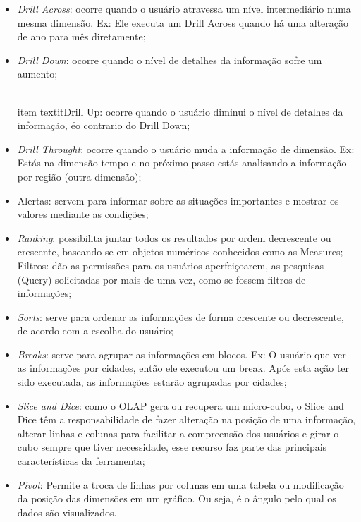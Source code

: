 \begin{itemize}

    \item \textit{Drill Across}: ocorre quando o usuário atravessa um nível intermediário numa mesma dimensão. Ex: Ele executa um Drill Across quando há uma alteração de ano para mês diretamente;

    \item \textit{Drill Down}: ocorre quando o nível de detalhes da informação sofre um aumento;
    
    \\item textit{Drill Up}: ocorre quando o usuário diminui o nível de detalhes da informação, \'{e}o contrario do Drill Down;
    
    \item \textit{Drill Throught}: ocorre quando o usuário muda a informação de dimensão. Ex: Estás na dimensão tempo e no próximo passo estás analisando a informação por região (outra dimensão);
    
    \item Alertas: servem para informar sobre as situações importantes e mostrar os valores mediante as condições;
    
    \item \textit{Ranking}: possibilita juntar todos os resultados por ordem decrescente ou crescente, baseando-se em objetos numéricos conhecidos como as Measures;
    Filtros: d\~{a}o as permissões para os usuários aperfeiçoarem, as pesquisas (Query) solicitadas por mais de uma vez, como se fossem filtros de informações;
    
    \item \textit{Sorts}: serve para ordenar as informações de forma crescente ou decrescente, de acordo com a escolha do usuário;
    
    \item \textit{Breaks}: serve para agrupar as informações em blocos. Ex: O usuário que ver as informações por cidades, então ele executou um break. Após esta ação ter sido executada, as informações estarão agrupadas por cidades;
    
    \item \textit{Slice and Dice}: como o OLAP gera ou recupera um micro-cubo, o Slice and Dice têm a responsabilidade de fazer alteração na posição de uma informação, alterar linhas e colunas para facilitar a compreensão dos usuários e girar o cubo sempre que tiver necessidade, esse recurso faz parte das principais características da ferramenta;
    
    \item \textit{Pivot}: Permite a troca de linhas por colunas em uma tabela ou modificação da posição das dimensões em um gráfico. Ou seja, \'{e} o ângulo pelo qual os dados são visualizados.
    
\end{itemize}

